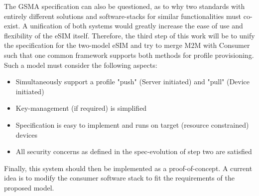 The GSMA specification can also be questioned, as to why two standards with entirely different solutions and software-stacks for similar functionalities must co-exist.
A unification of both systems would greatly increase the ease of use and flexibility of the eSIM itself.
Therefore, the third step of this work will be to unify the specification for the two-model eSIM and try to merge M2M with Consumer such that one common framework supports both methods for profile provisioning. Such a model must consider the following aspects:
\begin{itemize}
    \item Simultaneously support a profile "push" (Server initiated) and "pull" (Device initiated)
    \item Key-management (if required) is simplified
    \item Specification is easy to implement and runs on target (resource constrained) devices
    \item All security concerns as defined in the spec-evolution of step two are satisfied
\end{itemize}
Finally, this system should then be implemented as a proof-of-concept. A current idea is to modify the consumer software stack to fit the requirements of the proposed model. 

